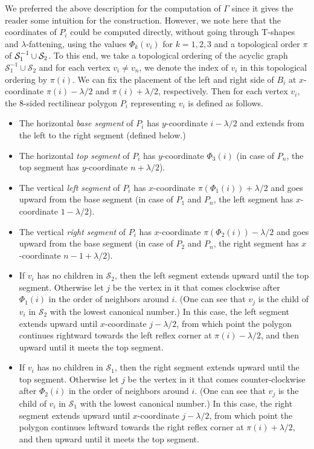 \documentclass[11pt]{article}
\begin{document}
We preferred the above description for the computation of $\Gamma$ since it gives the reader some intuition for
 the construction. However, we note here that the coordinates of $P_i$ could be computed directly, without going
 through T-shapes and $\lambda$-fattening, using the values $\Phi_k(v_i)$ for $k=1,2,3$ and a topological order
 $\pi$ of ${\cal S}_1^{-1}\cup {\cal S}_2$. To this end, we take a topological ordering of the acyclic
 graph $\mathcal{S}_1^{-1}\cup\mathcal{S}_2$ and for each vertex $v_i\neq v_n$, we denote the index of $v_i$ in
 this topological ordering by $\pi(i)$. We can fix the placement of the left and right side of $B_i$ at
 $x$-coordinate $\pi(i)-\lambda/2$ and $\pi(i)+\lambda/2$, respectively. Then for each vertex $v_i$,
 the 8-sided rectilinear polygon $P_i$ representing $v_i$ is defined as follows.

\begin{itemize}
	\item The horizontal \textit{base segment} of $P_i$ has $y$-coordinate $i-\lambda/2$ and extends from the left
		to the right segment (defined below.)
	\item The horizontal \textit{top segment} of $P_i$ has $y$-coordinate $\Phi_3(i)$ (in case of $P_n$, the top segment
		has $y$-coordinate $n+\lambda/2$).
	\item The vertical \textit{left segment} of $P_i$ has $x$-coordinate $\pi(\Phi_1(i)) + \lambda/2$ and goes upward
		from the base segment (in case of $P_1$ and $P_n$, the left segment has $x$-coordinate $1-\lambda/2$).
	\item The vertical \textit{right segment} of $P_i$ has $x$-coordinate $\pi(\Phi_2(i)) - \lambda/2$ and goes upward
		from the base segment (in case of $P_2$ and $P_n$, the right segment has $x$-coordinate $n-1+\lambda/2$).
	\item If $v_i$ has no children in $\mathcal{S}_2$, then the left segment extends upward until the top segment. Otherwise
		let $j$ be the vertex in it that comes clockwise after $\Phi_1(i)$ in the order of neighbors around $i$. (One can
		see that $v_j$ is the child of $v_i$ in $\mathcal{S}_2$ with the lowest canonical number.) In this case, the left
		segment extends upward until $x$-coordinate $j-\lambda/2$, from which point the polygon continues rightward towards
		the left reflex corner at $\pi(i) - \lambda/2$, and then upward until it meets the top segment.
	\item If $v_i$ has no children in $\mathcal{S}_1$, then the right segment extends upward until the top segment. Otherwise
		let $j$ be the vertex in it that comes counter-clockwise after $\Phi_2(i)$ in the order of neighbors around $i$.
		(One can see that $v_j$ is the child of $v_i$ in $\mathcal{S}_1$ with the lowest canonical number.) In this case,
		the right segment extends upward until $x$-coordinate $j-\lambda/2$, from which point the polygon continues leftward
		towards the right reflex corner at $\pi(i) + \lambda/2$, and then upward until it meets the top segment.
\end{itemize}
\end{document}
